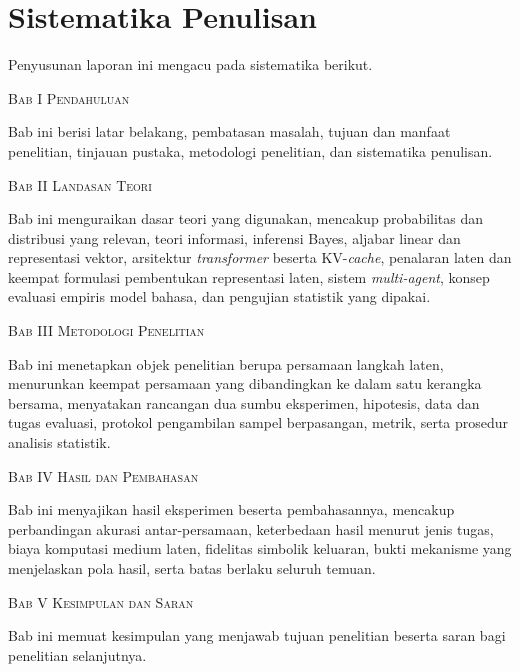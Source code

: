\section{Sistematika Penulisan}

Penyusunan laporan ini mengacu pada sistematika berikut.

\noindent\textsc{Bab I Pendahuluan}

Bab ini berisi latar belakang, pembatasan masalah, tujuan dan manfaat
penelitian, tinjauan pustaka, metodologi penelitian, dan sistematika
penulisan.

\noindent\textsc{Bab II Landasan Teori}

Bab ini menguraikan dasar teori yang digunakan, mencakup probabilitas dan
distribusi yang relevan, teori informasi, inferensi Bayes, aljabar linear dan
representasi vektor, arsitektur \textit{transformer} beserta KV-\textit{cache},
penalaran laten dan keempat formulasi pembentukan representasi laten, sistem
\textit{multi-agent}, konsep evaluasi empiris model bahasa, dan pengujian
statistik yang dipakai.

\noindent\textsc{Bab III Metodologi Penelitian}

Bab ini menetapkan objek penelitian berupa persamaan langkah laten,
menurunkan keempat persamaan yang dibandingkan ke dalam satu kerangka bersama,
menyatakan rancangan dua sumbu eksperimen, hipotesis, data dan tugas evaluasi,
protokol pengambilan sampel berpasangan, metrik, serta prosedur analisis
statistik.

\noindent\textsc{Bab IV Hasil dan Pembahasan}

Bab ini menyajikan hasil eksperimen beserta pembahasannya, mencakup
perbandingan akurasi antar-persamaan, keterbedaan hasil menurut jenis tugas,
biaya komputasi medium laten, fidelitas simbolik keluaran, bukti mekanisme
yang menjelaskan pola hasil, serta batas berlaku seluruh temuan.

\noindent\textsc{Bab V Kesimpulan dan Saran}

Bab ini memuat kesimpulan yang menjawab tujuan penelitian beserta saran bagi
penelitian selanjutnya.
